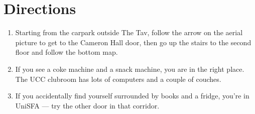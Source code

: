 \pagebreak


\section{Directions}

\begin{enumerate}
	\item Starting from the carpark outside The Tav, follow the arrow on the aerial picture to get to the Cameron Hall door, then go up the stairs to the second floor and follow the bottom map.
	\item If you see a coke machine and a snack machine, you are in the right place. The UCC clubroom has lots of computers and a couple of couches.
	\item If you accidentally find yourself surrounded by books and a fridge, you're in UniSFA --- try the other door in that corridor.
\end{enumerate}

